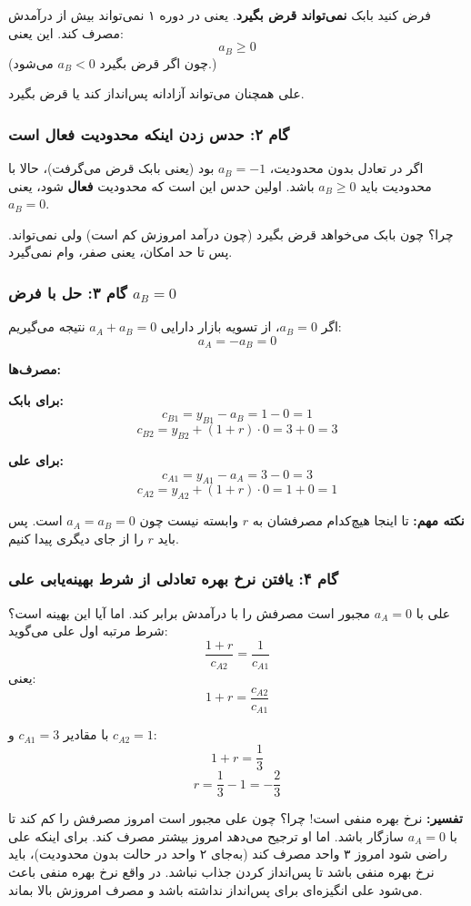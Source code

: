 \documentclass[12pt,a4paper]{article}
\begin{document}
فرض کنید بابک \textbf{نمی‌تواند قرض بگیرد}. یعنی در دوره ۱ نمی‌تواند بیش از درآمدش مصرف کند. این یعنی:
\[
	a_B \geq 0
\]
(چون اگر قرض بگیرد $a_B < 0$ می‌شود.)

علی همچنان می‌تواند آزادانه پس‌انداز کند یا قرض بگیرد.

\subsubsection{گام ۲: حدس زدن اینکه محدودیت فعال است}

اگر در تعادل بدون محدودیت، $a_B = -1$ بود (یعنی بابک قرض می‌گرفت)، حالا با محدودیت باید $a_B \geq 0$ باشد. اولین حدس این است که محدودیت \textbf{فعال} شود، یعنی $a_B = 0$.

چرا؟ چون بابک می‌خواهد قرض بگیرد (چون درآمد امروزش کم است) ولی نمی‌تواند. پس تا حد امکان، یعنی صفر، وام نمی‌گیرد.

\subsubsection{گام ۳: حل با فرض $a_B = 0$}

اگر $a_B = 0$، از تسویه بازار دارایی $a_A + a_B = 0$ نتیجه می‌گیریم:
\[
	a_A = -a_B = 0
\]

\textbf{مصرف‌ها:}

\textbf{برای بابک:}
\[
	c_{B1} = y_{B1} - a_B = 1 - 0 = 1
\]
\[
	c_{B2} = y_{B2} + (1+r) \cdot 0 = 3 + 0 = 3
\]

\textbf{برای علی:}
\[
	c_{A1} = y_{A1} - a_A = 3 - 0 = 3
\]
\[
	c_{A2} = y_{A2} + (1+r) \cdot 0 = 1 + 0 = 1
\]

\textbf{نکته مهم:} تا اینجا هیچ‌کدام مصرفشان به $r$ وابسته نیست چون $a_A = a_B = 0$ است. پس باید $r$ را از جای دیگری پیدا کنیم.

\subsubsection{گام ۴: یافتن نرخ بهره تعادلی از شرط بهینه‌یابی علی}

علی با $a_A = 0$ مجبور است مصرفش را با درآمدش برابر کند. اما آیا این بهینه است؟ شرط مرتبه اول علی می‌گوید:
\[
	\frac{1+r}{c_{A2}} = \frac{1}{c_{A1}}
\]
یعنی:
\[
	1+r = \frac{c_{A2}}{c_{A1}}
\]

با مقادیر $c_{A1} = 3$ و $c_{A2} = 1$:
\[
	1+r = \frac{1}{3}
\]
\[
	\boxed{r = \frac{1}{3} - 1 = -\frac{2}{3}}
\]

\textbf{تفسیر:} نرخ بهره منفی است! چرا؟ چون علی مجبور است امروز مصرفش را کم کند تا با $a_A = 0$ سازگار باشد. اما او ترجیح می‌دهد امروز بیشتر مصرف کند. برای اینکه علی راضی شود امروز ۳ واحد مصرف کند (به‌جای ۲ واحد در حالت بدون محدودیت)، باید نرخ بهره منفی باشد تا پس‌انداز کردن جذاب نباشد. در واقع نرخ بهره منفی باعث می‌شود علی انگیزه‌ای برای پس‌انداز نداشته باشد و مصرف امروزش بالا بماند.
\end{document}

